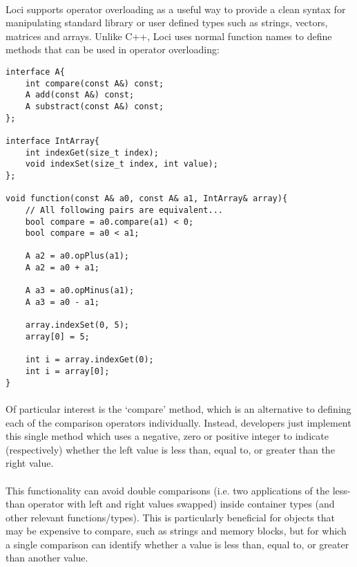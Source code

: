 \documentclass[12pt,twoside,notitlepage]{report}
\begin{document}
\paragraph{}
Loci supports operator overloading as a useful way to provide a clean syntax for manipulating standard library or user defined types such as strings, vectors, matrices and arrays. Unlike C++, Loci uses normal function names to define methods that can be used in operator overloading:


\begin{lstlisting}
interface A{
	int compare(const A&) const;
	A add(const A&) const;
	A substract(const A&) const;
};

interface IntArray{
	int indexGet(size_t index);
	void indexSet(size_t index, int value);
};

void function(const A& a0, const A& a1, IntArray& array){
	// All following pairs are equivalent...
	bool compare = a0.compare(a1) < 0;
	bool compare = a0 < a1;
	
	A a2 = a0.opPlus(a1);
	A a2 = a0 + a1;
	
	A a3 = a0.opMinus(a1);
	A a3 = a0 - a1;
	
	array.indexSet(0, 5);
	array[0] = 5;
	
	int i = array.indexGet(0);
	int i = array[0];
}
\end{lstlisting}

\paragraph{}
Of particular interest is the `compare' method, which is an alternative to defining each of the comparison operators individually. Instead, developers just implement this single method which uses a negative, zero or positive integer to indicate (respectively) whether the left value is less than, equal to, or greater than the right value.

\paragraph{}
This functionality can avoid double comparisons (i.e. two applications of the less-than operator with left and right values swapped) inside container types (and other relevant functions/types). This is particularly beneficial for objects that may be expensive to compare, such as strings and memory blocks, but for which a single comparison can identify whether a value is less than, equal to, or greater than another value.
\end{document}
